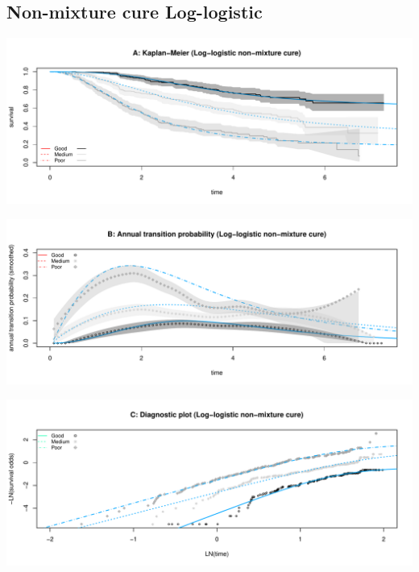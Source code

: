 \documentclass[]{article}
\begin{document}
\subsection{Non-mixture cure
Log-logistic}\label{non-mixture-cure-log-logistic}

\begin{flushleft}\includegraphics[height=0.25\textheight]{Images/cure_llog_nmix-1} \end{flushleft}

\begin{flushleft}\includegraphics[height=0.25\textheight]{Images/cure_llog_nmix-2} \end{flushleft}

\begin{flushleft}\includegraphics[height=0.25\textheight]{Images/cure_llog_nmix-3} \end{flushleft}

\newpage
\end{document}
